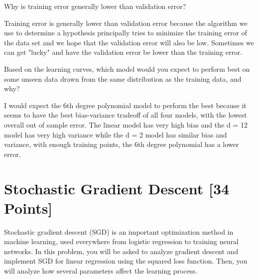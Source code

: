 \begin{problem}[3]
  Why is training error generally lower than validation error?
\end{problem}
\begin{solution}
  Training error is generally lower than validation error because the algorithm we use
  to determine a hypothesis principally tries to minimize the training error of the
  data set and we hope that the validation error will also be low. Sometimes we can
  get "lucky" and have the validation error be lower than the training error.
\end{solution}

\begin{problem}[3]
  Based on the learning curves, which model would you expect to perform best on some unseen data drawn from the same distribution as the training data, and why?
\end{problem}
\begin{solution}
  I would expect the 6th degree polynomial model to perform the best because it seems to
  have the best bias-variance tradeoff of all four models, with the lowest overall out of sample error. The linear model has very high bias and the d = 12 model has very high variance while the d = 2 model has similar bias and variance, with enough training points, the 6th degree polynomial has a lower error.
\end{solution}





\newpage
\section{Stochastic Gradient Descent [34 Points]}

Stochastic gradient descent (SGD) is an important optimization method in machine learning, used everywhere from logistic regression to training neural networks. In this problem, you will be asked to analyze gradient descent and implement SGD for linear regression using the squared loss function. Then, you will analyze how several parameters affect the learning process.


